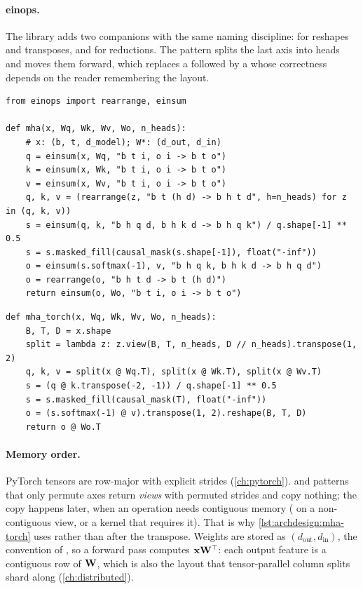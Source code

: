 \paragraph{einops.} The  library adds two companions with the same naming
discipline:  for reshapes and transposes, and  for reductions. The
pattern  splits the last axis into heads and moves them forward,
which replaces a  followed by a  whose correctness depends on the reader
remembering the layout.

\begin{lstlisting}[caption={Multi-head attention written with named axes (compare \cref{lst:archdesign:mha-torch}).},label={lst:archdesign:mha-einops}]
from einops import rearrange, einsum

def mha(x, Wq, Wk, Wv, Wo, n_heads):
    # x: (b, t, d_model); W*: (d_out, d_in)
    q = einsum(x, Wq, "b t i, o i -> b t o")
    k = einsum(x, Wk, "b t i, o i -> b t o")
    v = einsum(x, Wv, "b t i, o i -> b t o")
    q, k, v = (rearrange(z, "b t (h d) -> b h t d", h=n_heads) for z in (q, k, v))
    s = einsum(q, k, "b h q d, b h k d -> b h q k") / q.shape[-1] ** 0.5
    s = s.masked_fill(causal_mask(s.shape[-1]), float("-inf"))
    o = einsum(s.softmax(-1), v, "b h q k, b h k d -> b h q d")
    o = rearrange(o, "b h t d -> b t (h d)")
    return einsum(o, Wo, "b t i, o i -> b t o")
\end{lstlisting}

\begin{lstlisting}[caption={The same computation with positional axes, as in \texttt{llmsys/layers.py}.},label={lst:archdesign:mha-torch}]
def mha_torch(x, Wq, Wk, Wv, Wo, n_heads):
    B, T, D = x.shape
    split = lambda z: z.view(B, T, n_heads, D // n_heads).transpose(1, 2)
    q, k, v = split(x @ Wq.T), split(x @ Wk.T), split(x @ Wv.T)
    s = (q @ k.transpose(-2, -1)) / q.shape[-1] ** 0.5
    s = s.masked_fill(causal_mask(T), float("-inf"))
    o = (s.softmax(-1) @ v).transpose(1, 2).reshape(B, T, D)
    return o @ Wo.T
\end{lstlisting}

\paragraph{Memory order.} PyTorch tensors are row-major with explicit strides (\cref{ch:pytorch}).
 and  patterns that only permute axes return \emph{views} with
permuted strides and copy nothing; the copy happens later, when an operation needs contiguous
memory ( on a non-contiguous view, or a kernel that requires it). That is why
\cref{lst:archdesign:mha-torch} uses  rather than  after the transpose.
Weights are stored as $(d_\text{out}, d_\text{in})$, the convention of , so a
forward pass computes $\mathbf{x}\mathbf{W}^\top$: each output feature is a contiguous row of
$\mathbf{W}$, which is also the layout that tensor-parallel column splits shard along
(\cref{ch:distributed}).

